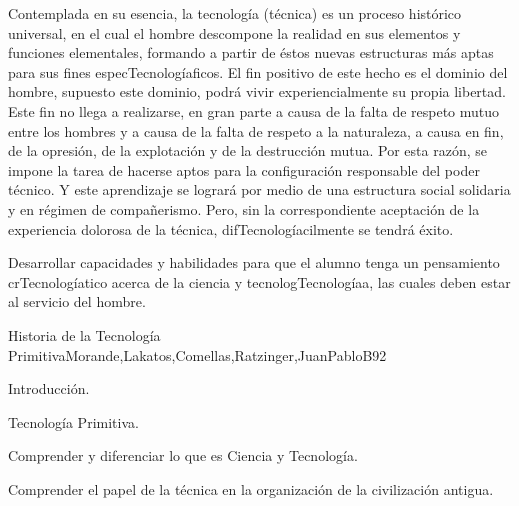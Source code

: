 \begin{syllabus}


\begin{justification}

Contemplada en su esencia, la tecnología (técnica) es un proceso histórico universal, en el cual el hombre descompone la realidad en sus elementos y funciones elementales, formando a partir de éstos nuevas estructuras más aptas para sus fines especTecnologíaficos.
El fin positivo de este hecho es el dominio del hombre,  supuesto este dominio, podrá vivir experiencialmente su propia libertad. Este fin no llega a realizarse, en gran parte a causa de la falta de respeto mutuo entre los hombres y a causa de la falta de respeto a la naturaleza, a causa en fin, de la opresión, de la explotación y de la destrucción mutua.
Por esta razón, se impone la tarea de hacerse aptos para la configuración responsable del poder técnico. Y este aprendizaje se logrará por medio de una estructura social solidaria y en régimen de compañerismo. Pero, sin la correspondiente aceptación de la experiencia dolorosa de la técnica, difTecnologíacilmente se tendrá éxito.
\end{justification}

\begin{goals}
\item Desarrollar capacidades y habilidades para que el alumno tenga un pensamiento crTecnologíatico acerca de  la ciencia y tecnologTecnologíaa, las cuales deben estar al servicio del hombre.
\end{goals}

\begin{outcomes}
\end{outcomes}

\begin{unit}{Historia de la Tecnología Primitiva}{Morande,Lakatos,Comellas,Ratzinger,JuanPabloB}{9}{2}
\begin{topics}
      \item Introducción.
      \item Tecnología Primitiva.
\end{topics}

\begin{unitgoals}
	\item Comprender y diferenciar lo que es Ciencia y Tecnología. 
 	\item Comprender el papel de la técnica en la organización de la civilización antigua.
\end{unitgoals}
\end{unit}


\end{syllabus}

